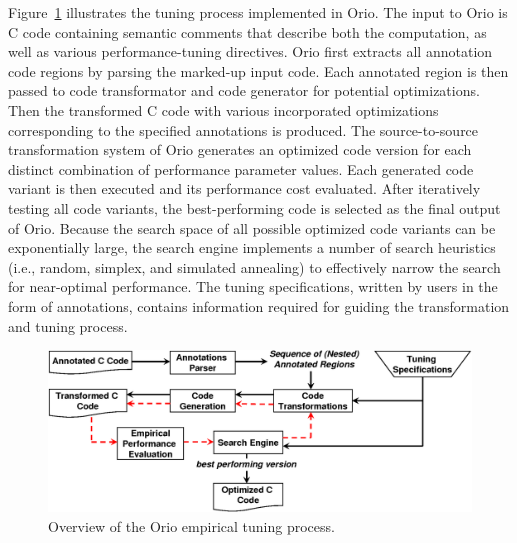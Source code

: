 \documentclass[runningheads]{llncs}
\begin{document}
Figure~\ref{fig:orio} illustrates the tuning process implemented in
Orio. The input to Orio is C code containing semantic comments that
describe both the computation, as well as various performance-tuning
directives. Orio first extracts all annotation code regions by parsing
the marked-up input code. Each annotated region is then passed to code
transformator and code generator for potential optimizations. Then the
transformed C code with various incorporated optimizations
corresponding to the specified annotations is produced. The
source-to-source transformation system of Orio generates an optimized
code version for each distinct combination of performance parameter
values. Each generated code variant is then executed and its
performance cost evaluated. After iteratively testing all code
variants, the best-performing code is selected as the final output of
Orio. Because the search space of all possible optimized code variants
can be exponentially large, the search engine implements a number of
search heuristics (i.e., random, simplex, and simulated annealing) to
effectively narrow the search for near-optimal performance. The tuning
specifications, written by users in the form of annotations, contains
information required for guiding the transformation and tuning
process.

\begin{figure}[tb]
\begin{center}
\includegraphics[width=.65\textwidth]{figures/orio.png}
\end{center}
\vspace{-.2in}
\caption{Overview of the Orio empirical tuning process.}
\label{fig:orio}
\vspace{-.2in}
\end{figure}

\end{document}
